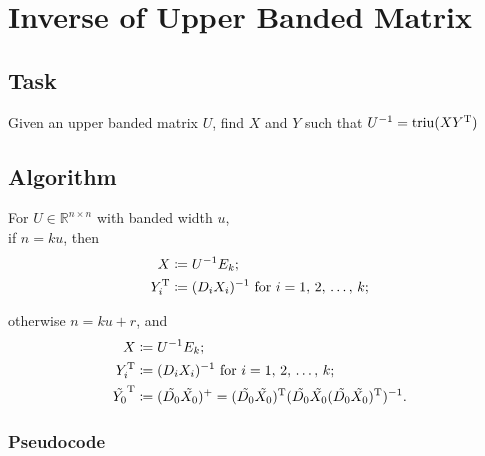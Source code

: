 \chapter{Inverse of Upper Banded Matrix}



\section{Task}

\noindent Given an upper banded matrix $U$, find $X$ and $Y$ such that $U^{-1} = \mathop{\mathrm{triu}}(X Y^{\mathrm{T}})$



\section{Algorithm}

\noindent For $U \in \mathbb{R}^{n \times n}$ with banded width $u$, \\
if $n = ku$, then
\begin{align*}
    X &\coloneqq U^{-1} E_{k}; \\
    Y_{i}^{\mathrm{T}} &\coloneqq (D_{i} X_{i})^{-1}\ \text{for} \ i = 1,\, 2,\, \dots,\, k;
\end{align*}

\noindent otherwise $n = ku+r$, and
\begin{align*}
    X &\coloneqq U^{-1} E_{k}; \\
    Y_{i}^{\mathrm{T}} &\coloneqq (D_{i} X_{i})^{-1}\ \text{for} \ i = 1,\, 2,\, \dots,\, k;\\
    \tilde{Y_{0}}^{\mathrm{T}} &\coloneqq (\tilde{D_{0}} \tilde{X_{0}})^{+} = (\tilde{D_{0}} \tilde{X_{0}})^{\mathrm{T}} (\tilde{D_{0}} \tilde{X_{0}} (\tilde{D_{0}} \tilde{X_{0}})^{\mathrm{T}})^{-1}.
\end{align*}

\newpage
\subsection{Pseudocode}

